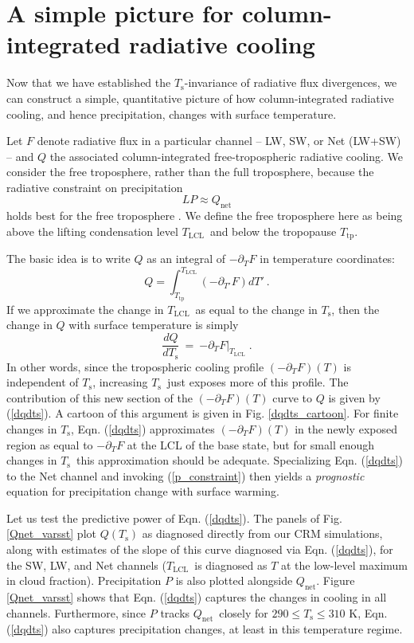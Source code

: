 \documentclass[10pt]{article}
\newcommand{\beqn}{\begin{equation}}
\newcommand{\eeqn}{\end{equation}}
\newcommand{\eqnref}[1]{(\ref{#1})}
\newcommand{\n}{\nonumber}
\newcommand{\der}[2]{\ensuremath{\frac{d #1}{d #2}}}
\newcommand{\ppt}{\ensuremath{\partial_T}}
\newcommand{\Qnet}{\ensuremath{Q_\mathrm{net}}}
\newcommand{\Ts}{\ensuremath{T_\mathrm{s}}}
\newcommand{\Tlcl}{\ensuremath{T_\mathrm{LCL}}}
\newcommand{\Ttp}{\ensuremath{T_\mathrm{tp}}}
\begin{document}
\section{A simple picture for column-integrated radiative cooling} \label{sec_simple_Q}

Now that we have established  the \Ts-invariance of radiative flux divergences, we can construct a simple, quantitative picture of how column-integrated radiative cooling, and hence precipitation,  changes with surface temperature. 
	
	Let $F$ denote radiative flux in a particular channel -- LW, SW, or Net (LW+SW) -- and $Q$ the associated column-integrated free-tropospheric radiative cooling. We consider  the free troposphere, rather than the full troposphere, because the radiative constraint on precipitation 
		\beqn
			LP \approx \Qnet
		\label{p_constraint}
		\eeqn
		 holds best for the free troposphere  \citep{ogorman2012}. We define the free troposphere here as being above the lifting condensation level \Tlcl\ and below the tropopause \Ttp.
	
	  The basic idea is to write $Q$ as an integral of $-\ppt F$  in temperature coordinates: 
	\beqn
		Q =  \int_{\Ttp}^{\Tlcl} (-\partial_{T'} F) dT' \ . 
		\n
	\eeqn
   If we approximate the change in  \Tlcl\ as equal to the change in \Ts, then the change in $Q$ with surface temperature is  simply
	\beqn
		\der{Q}{\Ts} \ =\  \left.  -\ppt F\right|_{\Tlcl}  \; .
	\label{dqdts}
	\eeqn
In other words, since the tropospheric cooling profile $(-\ppt F)(T)$  is independent of \Ts, increasing \Ts\ just exposes more of this profile.  The contribution of this new section of the $(-\ppt F)(T)$ curve to $Q$ is given by \eqnref{dqdts}.  A cartoon of this argument is given in Fig. \ref{dqdts_cartoon}. For finite changes in \Ts, Eqn. \eqnref{dqdts} approximates $(-\ppt F)(T)$ in the newly exposed region as equal to $-\ppt F$ at the LCL of the base state, but for small enough changes in \Ts\ this approximation should be adequate. Specializing Eqn. \eqnref{dqdts} to the Net channel and invoking \eqnref{p_constraint} then yields a \emph{prognostic} equation for precipitation change with surface warming.

Let us test the predictive power of Eqn. \eqnref{dqdts}. The panels of Fig. \ref{Qnet_varsst} plot $Q(\Ts)$ as diagnosed directly from our CRM simulations, along with estimates of the slope of this curve diagnosed via  Eqn. \eqnref{dqdts}, for the SW, LW, and Net  channels (\Tlcl\ is diagnosed as $T$ at the low-level maximum in cloud fraction). Precipitation $P$ is also plotted alongside $\Qnet$.  Figure \ref{Qnet_varsst} shows that  Eqn. \eqnref{dqdts}  captures the changes in  cooling in all channels. Furthermore, since $P$ tracks \Qnet\ closely for $290\leq \Ts \leq 310$ K, Eqn. \eqnref{dqdts} also captures precipitation changes, at least in this temperature regime.
\end{document}
